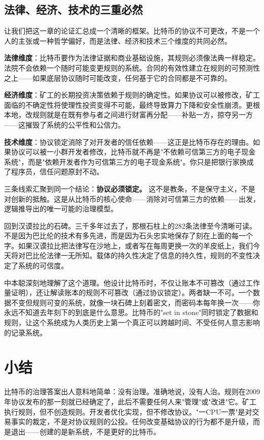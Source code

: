 \documentclass[a4paper,12pt,openany]{ctexbook}
\begin{document}
\subsection*{法律、经济、技术的三重必然}


让我们把这一章的论证汇总成一个清晰的框架。比特币的协议不可更改，不是一个人的主张或一种哲学偏好，而是法律、经济和技术三个维度的共同必然。

\textbf{法律维度}：比特币要作为法律证据和商业基础设施，其规则必须像法典一样稳定。法院不会依赖一个随时可能变更规则的系统。合同的有效性建立在规则的可预测性之上——如果底层协议随时可能改变，任何基于它的合同都是不可靠的。

\textbf{经济维度}：矿工的长期投资决策依赖于规则的确定性。如果协议可以被修改，矿工面临的不确定性将使理性投资变得不可能，最终导致算力下降和安全性崩溃。更根本地，改规则就是在既有参与者之间进行财富再分配——补贴一方，掠夺另一方——这摧毁了系统的公平性和公信力。

\textbf{技术维度}：协议锁定消除了对开发者的信任依赖——这正是比特币存在的理由。如果协议可以被一小群开发者修改，比特币就不再是"不依赖可信第三方的电子现金系统"，而是"依赖开发者作为可信第三方的电子现金系统"。你只是把银行家换成了程序员，信任问题原封不动。

三条线索汇聚到同一个结论：\textbf{协议必须锁定。} 这不是教条，不是保守主义，不是对创新的抵触。这是从比特币的核心使命——消除对可信第三方的依赖——出发，逻辑推导出的唯一可能的治理模型。

回到汉谟拉比的石碑。三千多年过去了，那根石柱上的282条法律至今清晰可读。不是因为巴比伦的技术有多先进，而是因为石头忠实地保存了刻在上面的每一个字。如果汉谟拉比把法律写在沙地上，或者写在每周更换一次的羊皮纸上，我们今天将对巴比伦法律一无所知。载体的持久性决定了信息的持久性，规则的不变性决定了系统的可信度。

中本聪深刻地理解了这个道理。他设计比特币时，不仅让账本不可篡改（通过工作量证明），还让解读账本的规则不可篡改（通过协议锁定）。两者缺一不可。一个数据不变但规则可变的系统，就像一块石碑上刻着密文，而密码本每年换一次——你永远不知道去年刻下的到底是什么意思。比特币的"set in stone"同时锁定了数据和规则，让这个系统成为人类历史上第一个真正可以跨越时间、不受任何人意志影响的记录系统。


\section*{小结}


比特币的治理答案出人意料地简单：没有治理。准确地说，没有人治。规则在2009年协议发布的那一刻就已经确定了，此后不需要任何人来"管理"或"改进"它。矿工执行规则，但不创造规则。开发者优化实现，但不修改协议。"一CPU一票"是对交易事实的裁定，不是对协议规则的公投。任何改变基础协议的行为都不是升级，而是退出——创建的是新系统，不是更好的比特币。
\end{document}
